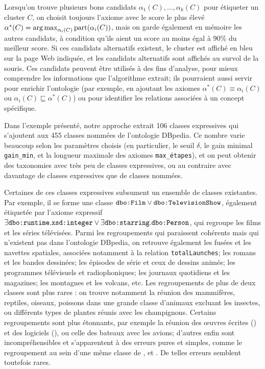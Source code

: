 Lorsqu'on trouve plusieurs bons candidats $\alpha_1(C), \ldots, \alpha_k(C)$ pour étiqueter un cluster $C$, on choisit toujours l'axiome avec le score le plus élevé $\alpha^*(C) = \operatorname*{arg\,max}_{\alpha_i(C)} \textrm{part}(\alpha_i(C))$, mais on garde également en mémoire les autres candidats, à condition qu'ils aient un score au moins égal à 90\% du meilleur score. Si ces candidats alternatifs existent, le cluster est affiché en bleu sur la page Web indiquée, et les candidats alternatifs sont affichés au survol de la souris.
Ces candidats peuvent être utilisés à des fins d'analyse, pour mieux comprendre les informations que l'algorithme extrait; ils pourraient aussi servir pour enrichir l'ontologie (par exemple, en ajoutant les axiomes $\alpha^*(C) \equiv \alpha_i(C)$ ou $\alpha_i(C) \sqsubseteq \alpha^*(C)$) ou pour identifier les relations associées à un concept spécifique.

Dans l'exemple présenté, notre approche extrait 106 classes expressives qui s'ajoutent aux 455 classes nommées de l'ontologie DBpedia.
Ce nombre varie beaucoup selon les paramètres choisis (en particulier, le seuil $\delta$, le gain minimal \texttt{gain\_min}, et la longueur maximale des axiomes \texttt{max\_étapes}), et on peut obtenir des taxonomies avec très peu de classes expressives, ou au contraire avec davantage de classes expressives que de classes nommées.

Certaines de ces classes expressives subsument un ensemble de classes existantes. Par exemple, il se forme une classe $\texttt{dbo:Film} \lor \texttt{dbo:TelevisionShow}$, également étiquetée par l'axiome expressif $\exists \texttt{dbo:runtime}.\texttt{xsd:integer} \lor \exists \texttt{dbo:starring}.\texttt{dbo:Person}$, qui regroupe les films et les séries télévisées. Parmi les regroupements qui paraissent cohérents mais qui n'existent pas dans l'ontologie DBpedia, on retrouve également les fusées et les navettes spatiales, associées notamment à la relation \texttt{totalLaunches}; les romans et les bandes dessinées; les épisodes de série et ceux de dessins animés; les programmes télévisuels et radiophoniques; les journaux quotidiens et les magazines; les montagnes et les volcans, etc. Les regroupements de plus de deux classes sont plus rares : on trouve notamment la réunion des mammifères, reptiles, oiseaux, poissons dans une grande classe d'animaux excluant les insectes, ou différents types de plantes réunis avec les champignons. Certains regroupements sont plus étonnants, par exemple la réunion des œuvres écrites () et des logiciels (), ou celle des bateaux avec les avions; d'autres enfin sont incompréhensibles et s'apparentent à des erreurs pures et simples, comme le regroupement au sein d'une même classe de ,  et . De telles erreurs semblent toutefois rares. %

